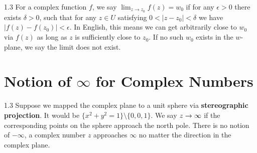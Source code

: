 \documentclass{article}
\newcommand{\framethis}[2][1.3]{
  \begin{framed}
    \begin{spacing}{#1}
      #2
    \end{spacing}
  \end{framed}
}
\begin{document}
  \framethis{For a complex function $f$, we say $\lim_{z \to z_0} f(z)= w_0$ if for any
  $\epsilon > 0$ there exists $\delta > 0$, such that for any $z \in U$ satisfying
  $ 0 < |z-z_0| < \delta$ we have $|f(z) - f(z_0)| < \epsilon$. In English, this means
  we can get arbitrarily close to $w_0$ via $f(z)$ as long as $z$ is sufficiently close
  to $z_0$. If no such $w_0$ exists in the $w$-plane, we say the limit does not exist.\el}



  \vspace{11mm}

  \section{Notion of $\infty$ for Complex Numbers} \vspace{7mm}

  \framethis{Suppose we mapped the complex plane to a unit sphere via \textbf{stereographic projection}.
  It would be $\{x^2+y^2 = 1\} \setminus \{0,0,1\}$. We say $z \rightarrow \infty$ if the 
  corresponding points on the sphere approach the north pole. There is no notion of $-\infty$,
  a complex number $z$ approaches $\infty$ no matter the direction in the complex plane.}

\end{document}
